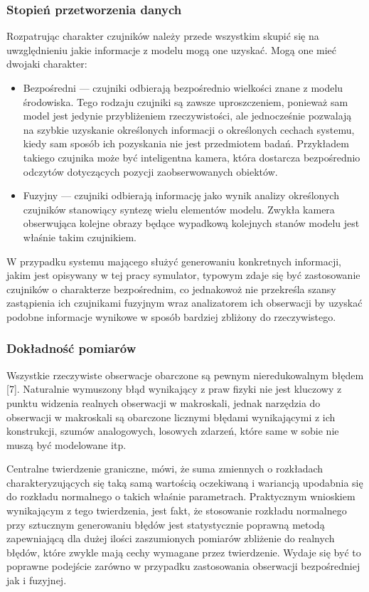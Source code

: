 \subsubsection{Stopień przetworzenia danych}
\par{
Rozpatrując charakter czujników należy przede wszystkim skupić się na uwzględnieniu jakie informacje z modelu mogą one uzyskać. Mogą one mieć dwojaki charakter:
\begin{itemize}
\item Bezpośredni --- czujniki odbierają bezpośrednio wielkości znane z modelu środowiska. Tego rodzaju czujniki są zawsze uproszczeniem, ponieważ sam model jest jedynie przybliżeniem rzeczywistości, ale jednocześnie pozwalają na szybkie uzyskanie określonych informacji o określonych cechach systemu, kiedy sam sposób ich pozyskania nie jest przedmiotem badań. Przykładem takiego czujnika może być inteligentna kamera, która dostarcza bezpośrednio odczytów dotyczących pozycji zaobserwowanych obiektów.
\item Fuzyjny --- czujniki odbierają informację jako wynik analizy określonych czujników stanowiący syntezę wielu elementów modelu. Zwykła kamera obserwująca kolejne obrazy będące wypadkową kolejnych stanów modelu jest właśnie takim czujnikiem.
\end{itemize}
W przypadku systemu mającego służyć generowaniu konkretnych informacji, jakim jest opisywany w tej pracy symulator, typowym zdaje się być zastosowanie czujników o charakterze bezpośrednim, co jednakowoż nie przekreśla szansy zastąpienia ich czujnikami fuzyjnym wraz analizatorem ich obserwacji by uzyskać podobne informacje wynikowe w sposób bardziej zbliżony do rzeczywistego.

\subsubsection{Dokładność pomiarów}
\par{
Wszystkie rzeczywiste obserwacje obarczone są pewnym nieredukowalnym błędem [7]. Naturalnie wymuszony błąd wynikający z praw fizyki nie jest kluczowy z punktu widzenia realnych obserwacji w makroskali, jednak narzędzia do obserwacji w makroskali są obarczone licznymi błędami wynikającymi z ich konstrukcji, szumów analogowych, losowych zdarzeń, które same w sobie nie muszą być modelowane itp.
}
\par{
Centralne twierdzenie graniczne, mówi, że suma zmiennych o rozkładach charakteryzujących się taką samą wartością oczekiwaną i wariancją upodabnia się do rozkładu normalnego o takich właśnie parametrach. Praktycznym wnioskiem wynikającym z tego twierdzenia, jest fakt, że stosowanie rozkładu normalnego przy sztucznym generowaniu błędów jest statystycznie poprawną metodą zapewniającą dla dużej ilości zaszumionych pomiarów zbliżenie do realnych błędów, które zwykle mają cechy wymagane przez twierdzenie. Wydaje się być to poprawne podejście zarówno w przypadku zastosowania obserwacji bezpośredniej jak i fuzyjnej.
}

}

